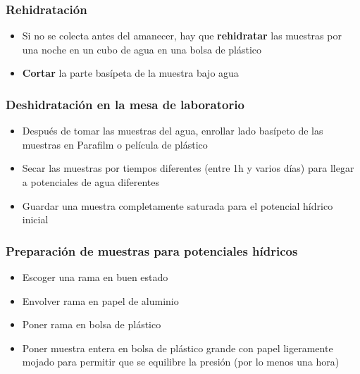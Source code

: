 \documentclass[usepdftitle=false]{beamer}
\newenvironment{changemargin}[2]{%
\begin{list}{}{%
\setlength{\topsep}{0pt}%
\setlength{\leftmargin}{#1}%
\setlength{\rightmargin}{#2}%
\setlength{\listparindent}{\parindent}%
\setlength{\itemindent}{\parindent}%
\setlength{\parsep}{\parskip}%
}%
\item[]}{\end{list}}
\newcommand{\tw}{\textwidth}
\begin{document}
\begin{frame}
	\frametitle{Rehidratación}
\begin{minipage}{0.38\tw}
	\centering
\end{minipage}
\begin{minipage}{0.6\tw}
	\begin{itemize}[<+->]
		\item Si no se colecta antes del amanecer, hay que \textbf{rehidratar} las muestras por una noche en un cubo de agua en una bolsa de plástico
		\item \textbf{Cortar} la parte basípeta de la muestra bajo agua
	\end{itemize}	
\end{minipage}	
\end{frame}

\begin{frame}
\frametitle{Deshidratación en la mesa de laboratorio}
\begin{itemize}[<+-| alert@+>]
  \item Después de tomar las muestras del agua, enrollar lado basípeto de las muestras en Parafilm o película de plástico
  \item Secar las muestras por tiempos diferentes (entre 1h y varios días) para llegar a potenciales de agua diferentes
  \item Guardar una muestra completamente saturada para el potencial hídrico inicial
\end{itemize}	
\end{frame}



\begin{frame}
	\frametitle{Preparación de muestras para potenciales hídricos}
\begin{changemargin}{-2em}{-2em}
\begin{minipage}{0.5\paperwidth}
  \begin{itemize}[<+-| alert@+>]
    \item Escoger una rama en buen estado
    \item Envolver rama en papel de aluminio
	\item Poner rama en bolsa de plástico
	\item Poner muestra entera en bolsa de plástico grande con papel ligeramente mojado para permitir que se equilibre la presión (por lo menos una hora)
  \end{itemize}	
\end{minipage}	
\quad\
\begin{minipage}{0.4\paperwidth}
  \centering
\end{minipage}
\end{changemargin}
\end{frame}
\end{document}
